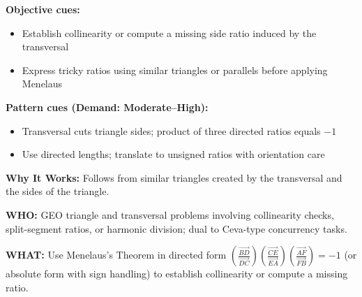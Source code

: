 \documentclass[12pt]{article}
\begin{document}
\textbf{Objective cues:}
\begin{itemize}
    \item Establish collinearity or compute a missing side ratio induced by the transversal
    \item Express tricky ratios using similar triangles or parallels before applying Menelaus
\end{itemize}

\textbf{Pattern cues (Demand: Moderate–High):}
\begin{itemize}
    \item Transversal cuts triangle sides; product of three directed ratios equals $-1$
    \item Use directed lengths; translate to unsigned ratios with orientation care
\end{itemize}

\textbf{Why It Works:} Follows from similar triangles created by the transversal and the sides of the triangle.

\textbf{WHO:} GEO triangle and transversal problems involving collinearity checks, split-segment ratios, or harmonic division; dual to Ceva-type concurrency tasks.

\textbf{WHAT:} Use Menelaus's Theorem in directed form $\left(\tfrac{\overrightarrow{BD}}{\overrightarrow{DC}}\right)\!\left(\tfrac{\overrightarrow{CE}}{\overrightarrow{EA}}\right)\!\left(\tfrac{\overrightarrow{AF}}{\overrightarrow{FB}}\right)=-1$ (or absolute form with sign handling) to establish collinearity or compute a missing ratio.
\end{document}
